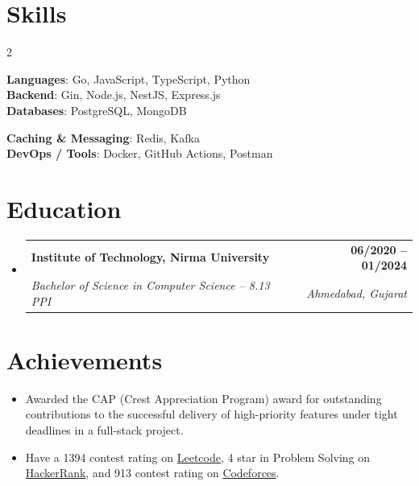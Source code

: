 \documentclass[letterpaper,12pt]{article}
\makeatletter
\newcommand{\resumeItem}[1]{
  \item\small{
    {#1 \vspace{-2pt}}
  }
}
\newcommand{\resumeSubheading}[4]{
  \vspace{-2pt}\item
    \begin{tabular*}{1.0\textwidth}[t]{l@{\extracolsep{\fill}}r}
      \textbf{#1} & \textbf{\small #2} \\
      \textit{\small#3} & \textit{\small #4} \\
    \end{tabular*}\vspace{-7pt}
}
\newcommand{\resumeSubHeadingListStart}{\begin{itemize}[leftmargin=0.0in, label={}]}
\newcommand{\resumeSubHeadingListEnd}{\end{itemize}}
\newcommand{\resumeItemListStart}{\begin{itemize}}
\newcommand{\resumeItemListEnd}{\end{itemize}\vspace{-5pt}}
\makeatother
\begin{document}
\newpage
\section{Skills}
\vspace{-1pt}
\begin{multicols}{2}
\begin{itemize}[leftmargin=0.15in, label={}]
    \small{\item{
        \textbf{Languages}{: Go, JavaScript, TypeScript, Python} \\
        \textbf{Backend}{: Gin, Node.js, NestJS, Express.js} \\
        \textbf{Databases}{: PostgreSQL, MongoDB} \\
    }}
\end{itemize}
\columnbreak

\begin{itemize}[leftmargin=0.05in, label={}]
    \small{\item{
        \textbf{Caching \& Messaging}{: Redis, Kafka} \\
        \textbf{DevOps / Tools}{: Docker, GitHub Actions, Postman} \\
     }}
\end{itemize}
\end{multicols}
\vspace{-5pt}

\section{Education}
  \resumeSubHeadingListStart
    \resumeSubheading
      {Institute of Technology, Nirma University}{06/2020 -- 01/2024}
      {Bachelor of Science in Computer Science -- 8.13 PPI}{Ahmedabad, Gujarat}
  \resumeSubHeadingListEnd

\section{Achievements}
        \resumeItemListStart
            \resumeItem{Awarded the CAP (Crest Appreciation Program) award for outstanding contributions to the successful delivery of high-priority features under tight deadlines in a full-stack project.}
            \resumeItem{Have a 1394 contest rating on \href{https://leetcode.com/jainish011}{\color{blue}Leetcode}, 4 star in Problem Solving on \href{https://www.hackerrank.com/profile/jainishchauhan01}{\color{blue}HackerRank}, and 913 contest rating on \href{https://codeforces.com/profile/jainish011}{\color{blue}Codeforces}.}
    \resumeItemListEnd
    
\end{document}
